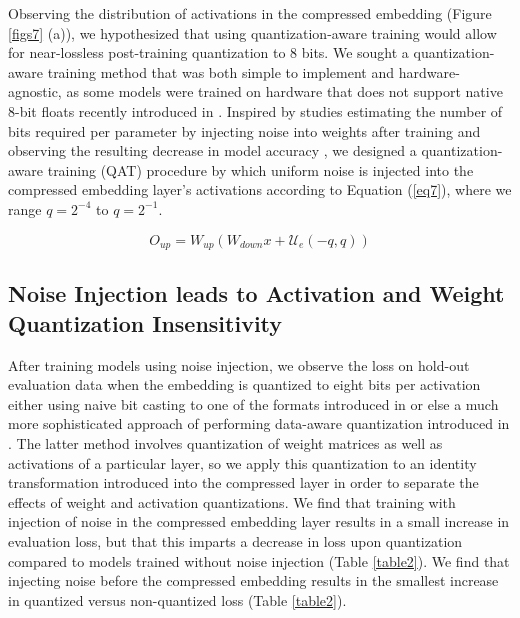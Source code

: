 \documentclass{article}
\begin{document}
    Observing the distribution of activations in the compressed embedding (Figure \ref{figs7} (a)), we hypothesized that using quantization-aware training would allow for near-lossless post-training quantization to 8 bits. We sought a quantization-aware training method that was both simple to implement and hardware-agnostic, as some models were trained on hardware that does not support native 8-bit floats recently introduced in \citep{micikevicius2022fp8formatsdeeplearning}. Inspired by studies estimating the number of bits required per parameter by injecting noise into weights after training and observing the resulting decrease in model accuracy \citep{rumelhart1986parallel, sejnowski1987parallel}, we designed a quantization-aware training (QAT) procedure by which uniform noise is injected into the compressed embedding layer's activations according to Equation (\ref{eq7}), where we range $q=2^{-4}$ to $q=2^{-1}$.
    
    \begin{equation}
    O_{up} = W_{up} \left( W_{down}x + \mathcal{U}_e(-q, q) \right)
    \label{eq7}
    \end{equation}

    \subsection{Noise Injection leads to Activation and Weight Quantization Insensitivity}

    After training models using noise injection, we observe the loss on hold-out evaluation data when the embedding is quantized to eight bits per activation either using naive bit casting to one of the formats introduced in \citep{micikevicius2022fp8formatsdeeplearning} or else a much more sophisticated approach of performing data-aware quantization introduced in \citep{dettmers2022llmint88bitmatrixmultiplication}. The latter method involves quantization of weight matrices as well as activations of a particular layer, so we apply this quantization to an identity transformation introduced into the compressed layer in order to separate the effects of weight and activation quantizations. We find that training with injection of noise in the compressed embedding layer results in a small increase in evaluation loss, but that this imparts a decrease in loss upon quantization compared to models trained without noise injection (Table \ref{table2}). We find that injecting noise before the compressed embedding results in the smallest increase in quantized versus non-quantized loss (Table \ref{table2}).
\end{document}
